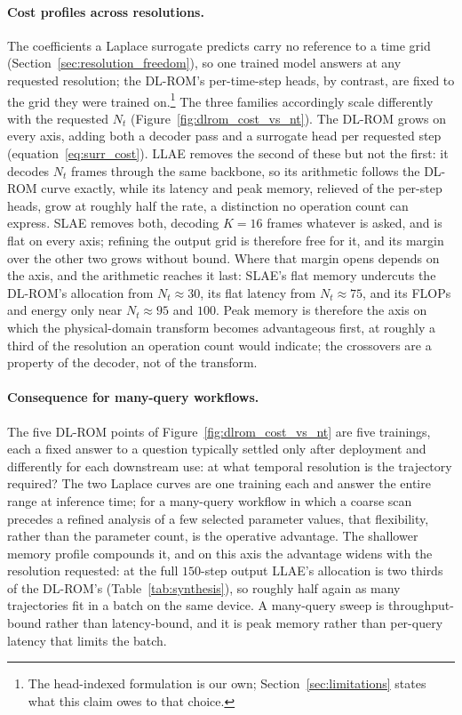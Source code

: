 ﻿\documentclass[a4paper,12pt]{article}
\theoremstyle{definition}
\theoremstyle{remark}
\begin{document}
\paragraph{Cost profiles across resolutions.}
The coefficients a Laplace surrogate predicts carry no reference to a time grid (Section~\ref{sec:resolution_freedom}), so one trained model answers at any requested resolution; the DL-ROM's per-time-step heads, by contrast, are fixed to the grid they were trained on.\footnote{The head-indexed formulation is our own; Section~\ref{sec:limitations} states what this claim owes to that choice.} The three families accordingly scale differently with the requested $N_t$ (Figure~\ref{fig:dlrom_cost_vs_nt}). The DL-ROM grows on every axis, adding both a decoder pass and a surrogate head per requested step (equation~\eqref{eq:surr_cost}). LLAE removes the second of these but not the first: it decodes $N_t$ frames through the same backbone, so its arithmetic follows the DL-ROM curve exactly, while its latency and peak memory, relieved of the per-step heads, grow at roughly half the rate, a distinction no operation count can express. SLAE removes both, decoding $K = 16$ frames whatever is asked, and is flat on every axis; refining the output grid is therefore free for it, and its margin over the other two grows without bound. Where that margin opens depends on the axis, and the arithmetic reaches it last: SLAE's flat memory undercuts the DL-ROM's allocation from $N_t \approx 30$, its flat latency from $N_t \approx 75$, and its FLOPs and energy only near $N_t \approx 95$ and $100$. Peak memory is therefore the axis on which the physical-domain transform becomes advantageous first, at roughly a third of the resolution an operation count would indicate; the crossovers are a property of the decoder, not of the transform.

\paragraph{Consequence for many-query workflows.}
The five DL-ROM points of Figure~\ref{fig:dlrom_cost_vs_nt} are five trainings, each a fixed answer to a question typically settled only after deployment and differently for each downstream use: at what temporal resolution is the trajectory required? The two Laplace curves are one training each and answer the entire range at inference time; for a many-query workflow in which a coarse scan precedes a refined analysis of a few selected parameter values, that flexibility, rather than the parameter count, is the operative advantage. The shallower memory profile compounds it, and on this axis the advantage widens with the resolution requested: at the full $150$-step output LLAE's allocation is two thirds of the DL-ROM's (Table~\ref{tab:synthesis}), so roughly half again as many trajectories fit in a batch on the same device. A many-query sweep is throughput-bound rather than latency-bound, and it is peak memory rather than per-query latency that limits the batch.
\end{document}
